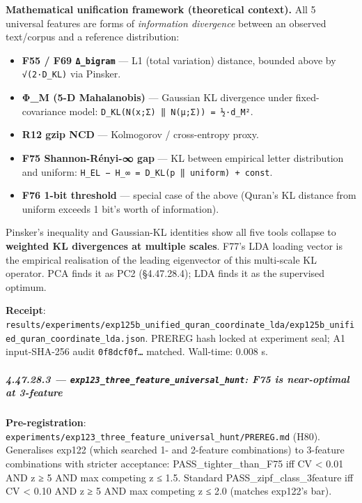 \documentclass[
]{article}
\providecommand{\tightlist}{%
  \setlength{\itemsep}{0pt}\setlength{\parskip}{0pt}}
\begin{document}
\textbf{Mathematical unification framework (theoretical context).} All 5
universal features are forms of \emph{information divergence} between an
observed text/corpus and a reference distribution:

\begin{itemize}
\tightlist
\item
  \textbf{F55 / F69 \texttt{Δ\_bigram}} --- L1 (total variation)
  distance, bounded above by \texttt{√(2·D\_KL)} via Pinsker.
\item
  \textbf{Φ\_M (5-D Mahalanobis)} --- Gaussian KL divergence under
  fixed-covariance model: \texttt{D\_KL(N(x;Σ)\ ‖\ N(μ;Σ))\ =\ ½·d\_M²}.
\item
  \textbf{R12 gzip NCD} --- Kolmogorov / cross-entropy proxy.
\item
  \textbf{F75 Shannon-Rényi-∞ gap} --- KL between empirical letter
  distribution and uniform:
  \texttt{H\_EL\ −\ H\_∞\ =\ D\_KL(p\ ‖\ uniform)\ +\ const}.
\item
  \textbf{F76 1-bit threshold} --- special case of the above (Quran's KL
  distance from uniform exceeds 1 bit's worth of information).
\end{itemize}

Pinsker's inequality and Gaussian-KL identities show all five tools
collapse to \textbf{weighted KL divergences at multiple scales}. F77's
LDA loading vector is the empirical realisation of the leading
eigenvector of this multi-scale KL operator. PCA finds it as PC2
(§4.47.28.4); LDA finds it as the supervised optimum.

\textbf{Receipt}:
\texttt{results/experiments/exp125b\_unified\_quran\_coordinate\_lda/exp125b\_unified\_quran\_coordinate\_lda.json}.
PREREG hash locked at experiment seal; A1 input-SHA-256 audit
\texttt{0f8dcf0f…} matched. Wall-time: 0.008 s.

\subparagraph{\texorpdfstring{4.47.28.3 ---
\texttt{exp123\_three\_feature\_universal\_hunt}: F75 is near-optimal at
3-feature}{4.47.28.3 --- exp123\_three\_feature\_universal\_hunt: F75 is near-optimal at 3-feature}}\label{exp123_three_feature_universal_hunt-f75-is-near-optimal-at-3-feature}

\textbf{Pre-registration}:
\texttt{experiments/exp123\_three\_feature\_universal\_hunt/PREREG.md}
(H80). Generalises exp122 (which searched 1- and 2-feature combinations)
to 3-feature combinations with stricter acceptance:
PASS\_tighter\_than\_F75 iff CV \textless{} 0.01 AND
\textbar z\textbar{} ≥ 5 AND max competing \textbar z\textbar{} ≤ 1.5.
Standard PASS\_zipf\_class\_3feature iff CV \textless{} 0.10 AND
\textbar z\textbar{} ≥ 5 AND max competing \textbar z\textbar{} ≤ 2.0
(matches exp122's bar).
\end{document}
